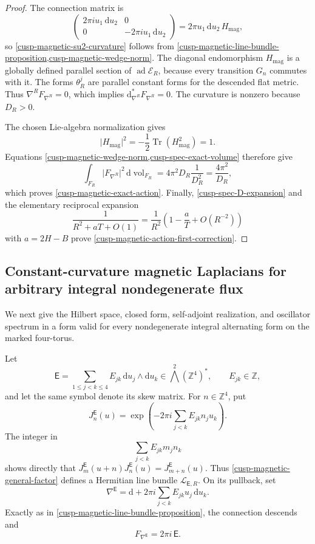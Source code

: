 \begin{proof}
The connection matrix is
\[
 \begin{pmatrix}
  2\pi i u_1\,\mathrm du_2&0\\
  0&-2\pi i u_1\,\mathrm du_2
 \end{pmatrix}
 =2\pi u_1\,\mathrm du_2\,H_{\mathrm{mag}},
\]
so \cref{cusp-magnetic-su2-curvature} follows from
\cref{cusp-magnetic-line-bundle-proposition,cusp-magnetic-wedge-norm}.
The diagonal endomorphism \(H_{\mathrm{mag}}\) is a
globally defined parallel section of \(\operatorname{ad}\mathscr E_R\),
because every transition \(G_n\) commutes with it.  The forms
\(\theta_R^j\) are parallel constant forms for the descended flat metric.
Thus \(\nabla^R F_{\nabla^R}=0\), which implies
\(\mathrm d_{\nabla^R}^*F_{\nabla^R}=0\).  The curvature is nonzero because
\(D_R>0\).

The chosen Lie-algebra normalization gives
\[
 \lvert H_{\mathrm{mag}}\rvert^2
 =-\frac12\operatorname{Tr}(H_{\mathrm{mag}}^2)=1.
\]
Equations \cref{cusp-magnetic-wedge-norm,cusp-spec-exact-volume} therefore
give
\[
 \int_{F_R}\lvert F_{\nabla^R}\rvert^2\,
   \mathrm d\operatorname{vol}_{F_R}
 =4\pi^2D_R\frac1{D_R^2}=\frac{4\pi^2}{D_R},
\]
which proves \cref{cusp-magnetic-exact-action}.  Finally,
\cref{cusp-spec-D-expansion} and the elementary reciprocal expansion
\[
 \frac1{R^2+aT+O(1)}
 =\frac1{R^2}\left(1-\frac aT+O(R^{-2})\right)
\]
with \(a=2H-B\) prove
\cref{cusp-magnetic-action-first-correction}.
\end{proof}

\subsection{Constant-curvature magnetic Laplacians for arbitrary integral
nondegenerate flux}

We next give the Hilbert space, closed form, self-adjoint realization, and
oscillator spectrum in a form valid for every nondegenerate integral
alternating form on the marked four-torus.

Let
\[
 \mathsf E=\sum_{1\le j<k\le4}E_{jk}\,\mathrm du_j\wedge\mathrm du_k
 \in\bigwedge^2(\mathbb Z^4)^*,
 \qquad E_{jk}\in\mathbb Z,
\]
and let the same symbol denote its skew matrix.  For \(n\in\mathbb Z^4\),
put
\begin{equation}
 J_n^{\mathsf E}(u)
 =\exp\!\left(-2\pi i\sum_{j<k}E_{jk}n_ju_k\right).
 \label{cusp-magnetic-general-factor}
\end{equation}
The integer in
\[
 \sum_{j<k}E_{jk}m_jn_k
\]
shows directly that
\(J_m^{\mathsf E}(u+n)J_n^{\mathsf E}(u)=J_{m+n}^{\mathsf E}(u)\).
Thus \eqref{cusp-magnetic-general-factor} defines a Hermitian line bundle
\(\mathscr L_{\mathsf E,R}\).  On its pullback, set
\begin{equation}
 \nabla^{\mathsf E}
 =\mathrm d+2\pi i\sum_{j<k}E_{jk}u_j\,\mathrm du_k.
 \label{cusp-magnetic-general-connection}
\end{equation}
Exactly as in \cref{cusp-magnetic-line-bundle-proposition}, the
connection descends and
\begin{equation}
 F_{\nabla^{\mathsf E}}=2\pi i\,\mathsf E.
 \label{cusp-magnetic-general-curvature}
\end{equation}


